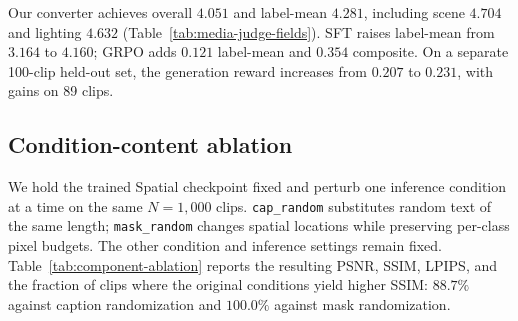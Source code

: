 \documentclass{article} %
\begin{document}
Our converter achieves overall $4.051$ and label-mean $4.281$,
including scene $4.704$ and lighting $4.632$
(Table~\ref{tab:media-judge-fields}). SFT raises label-mean from
$3.164$ to $4.160$; GRPO adds $0.121$ label-mean and $0.354$ composite.
On a separate 100-clip held-out set, the generation reward increases
from $0.207$ to $0.231$, with gains on 89 clips.

\begin{table}[h]
\centering
\caption{Per-field caption faithfulness on $N{=}1{,}000$ clips per source.
Values are mean judge scores from 1 to 5, using the judge, frames,
and protocol of Table~\ref{tab:media-judge}. Best values are in \textbf{bold}.}
\label{tab:media-judge-fields}
\end{table}

\subsection{Condition-content ablation}
We hold the trained Spatial checkpoint fixed and perturb one
inference condition at a time on the same $N{=}1{,}000$ clips.
\texttt{cap\_random} substitutes random text of the same length;
\texttt{mask\_random} changes spatial locations while preserving per-class
pixel budgets. The other condition and inference settings remain fixed.
Table~\ref{tab:component-ablation} reports the resulting PSNR, SSIM, LPIPS,
and the fraction of clips where the original conditions yield higher SSIM:
$88.7\%$ against caption randomization and $100.0\%$ against mask
randomization.
\end{document}
